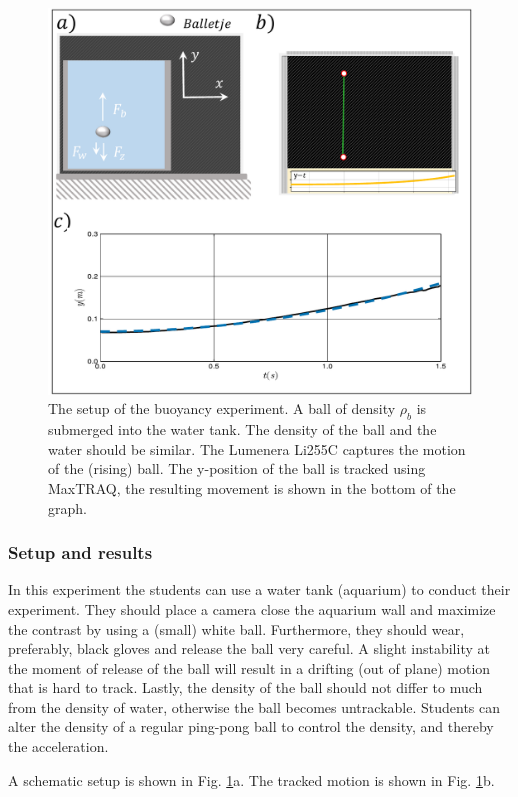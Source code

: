 \documentclass{article}
\begin{document}
\begin{figure}[H]
    \centering
    \includegraphics[width=12cm]{figures/Buoyancy.pdf}
    \caption{The setup of the buoyancy experiment. A ball of density $\rho_b$ is submerged into the water tank. The density of the ball and the water should be similar. The Lumenera Li255C captures the motion of the (rising) ball. The y-position of the ball is tracked using MaxTRAQ, the resulting movement is shown in the bottom of the graph.}
    \label{Figure: buoyancy setup}
\end{figure}

\subsubsection{Setup and results}
In this experiment the students can use a water tank (aquarium) to conduct their experiment. They should place a camera close the aquarium wall and maximize the contrast by using a (small) white ball. Furthermore, they should wear, preferably, black gloves and release the ball very careful. A slight instability at the moment of release of the ball will result in a drifting (out of plane) motion that is hard to track.
Lastly, the density of the ball should not differ to much from the density of water, otherwise the ball becomes untrackable. Students can alter the density of a regular ping-pong ball to control the density, and thereby the acceleration.

A schematic setup is shown in Fig. \ref{Figure: buoyancy setup}a. The tracked motion is shown in Fig. \ref{Figure: buoyancy setup}b.
\end{document}
